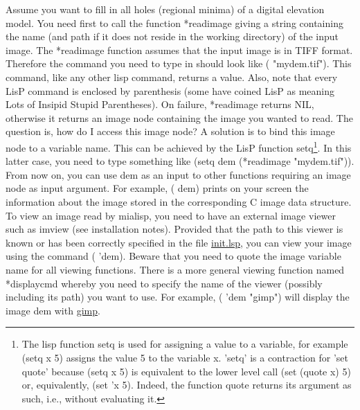 \documentclass{book}
\renewcommand{\htmladdnormallink}[2]{\href{#2}{#1}}
\begin{document}
Assume you want to fill in all holes (regional minima) of a digital elevation model.  You need first to call the function *readimage giving a string containing the name (and path if it does not reside in the working directory) of the input image.  The *readimage function assumes that the input image is in TIFF format.  Therefore the command you need to type in should look like ( "mydem.tif").  This command, like any other lisp command, returns a value.  Also, note that every LisP command is enclosed by parenthesis (some have coined LisP as meaning Lots of Insipid Stupid Parentheses).  On failure, *readimage returns NIL, otherwise it returns an image node containing the image you wanted to read.  The question is, how do I access this image node?  A solution is to bind this image node to a variable name.  This can be achieved by the LisP function setq\footnote{The lisp function setq is used for assigning a value to a variable, for example (setq x 5) assigns the value 5 to the variable x.  'setq' is a contraction for 'set quote' because (setq x 5) is equivalent to the lower level call (set (quote x) 5) or, equivalently, (set 'x 5).  Indeed, the function quote returns its argument as such, i.e., without evaluating it.}.  In this latter case, you need to type something like (setq dem (*readimage "mydem.tif")).  From now on, you can use dem as an input to other functions requiring an image node as input argument.  For example, ( dem) prints on your screen the information about the image stored in the corresponding C image data structure.  To view an image read by mialisp, you need to have an external image viewer such as imview (see installation notes).  Provided that the path to this viewer is known or has been correctly specified in the file  \htmladdnormallink{init.lsp}{../lsp/init.lsp}, you can view your image using the command ( 'dem).  Beware that you need to quote the image variable name for all viewing functions.  There is a more general viewing function named *displaycmd whereby you need to specify the name of the viewer (possibly including its path) you want to use.  For example, ( 'dem "gimp") will display the image dem with \htmladdnormallink{gimp}{gimp}.
\end{document}
